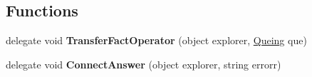 \subsection*{Functions}
\begin{DoxyCompactItemize}
\item 
\mbox{\label{namespacefile__transfer_aa1bc0e9b09376d68321faee261214d78}} 
delegate void {\bfseries Transfer\+Fact\+Operator} (object explorer, \hyperlink{classfile__transfer_1_1_queing}{Queing} que)
\item 
\mbox{\label{namespacefile__transfer_a556c325b0140203e8c7cc89a10df0c8b}} 
delegate void {\bfseries Connect\+Answer} (object explorer, string errorr)
\end{DoxyCompactItemize}
